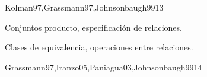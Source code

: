 \begin{sumilla}
\begin{outcomes}
\end{outcomes}

\begin{unit}{\DSUNODef}{Kolman97,Grassmann97,Johnsonbaugh99}{13}
\begin{topicos}
	\item  \DSUNOTopicFunciones
	\item  Conjuntos producto, especificaci\'on de relaciones.
	\item  \DSUNOTopicRelaciones
	\item  Clases de equivalencia, operaciones entre relaciones.
	\item  \DSUNOTopicConjuntos
	\item  \DSUNOTopicPrincipio
	\item  \DSUNOTopicCardinalidad
\end{topicos}

\begin{objetivos}
	\item \DSUNOObjUNO
	\item \DSUNOObjDOS
	\item \DSUNOObjTRES
	\item \DSUNOObjCUATRO
\end{objetivos}
\end{unit}

\begin{unit}{\DSDOSDef}{Grassmann97,Iranzo05,Paniagua03,Johnsonbaugh99}{14}
\begin{topicos}
         \item \DSDOSTopicLogica
         \item \DSDOSTopicConectivos
         \item \DSDOSTopicTablas
         \item \DSDOSTopicFormas
         \item \DSDOSTopicValidacion
         \item \DSDOSTopicLogicade
     \item \DSDOSTopicCuantificacion
         \item \DSDOSTopicModus
         \item \DSDOSTopicLimitaciones
   \end{topicos}

   \begin{objetivos}
      \item \DSDOSObjUNO
         \item \DSDOSObjDOS
         \item \DSDOSObjTRES
         \item \DSDOSObjCUATRO
   \end{objetivos}
\end{unit}


\end{sumilla}
